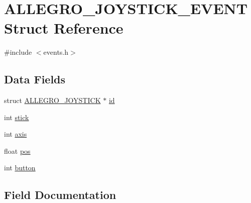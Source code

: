 \hypertarget{struct_a_l_l_e_g_r_o___j_o_y_s_t_i_c_k___e_v_e_n_t}{}\section{A\+L\+L\+E\+G\+R\+O\+\_\+\+J\+O\+Y\+S\+T\+I\+C\+K\+\_\+\+E\+V\+E\+NT Struct Reference}
\label{struct_a_l_l_e_g_r_o___j_o_y_s_t_i_c_k___e_v_e_n_t}


{\ttfamily \#include $<$events.\+h$>$}

\subsection*{Data Fields}
\begin{DoxyCompactItemize}
\item 
struct \hyperlink{joystick_8h_aae8de50d096b6e89e4796ceb2f78b925}{A\+L\+L\+E\+G\+R\+O\+\_\+\+J\+O\+Y\+S\+T\+I\+CK} $\ast$ \hyperlink{struct_a_l_l_e_g_r_o___j_o_y_s_t_i_c_k___e_v_e_n_t_a6d834b074d326f2ef56f8b7fb4c46da5}{id}
\item 
int \hyperlink{struct_a_l_l_e_g_r_o___j_o_y_s_t_i_c_k___e_v_e_n_t_a47182d42be549a78223d467d587a2e94}{stick}
\item 
int \hyperlink{struct_a_l_l_e_g_r_o___j_o_y_s_t_i_c_k___e_v_e_n_t_a0496f5b84f6d84344e2e59520c77bdb5}{axis}
\item 
float \hyperlink{struct_a_l_l_e_g_r_o___j_o_y_s_t_i_c_k___e_v_e_n_t_aa51cb89828f7479cc1d507a5d2ce64b5}{pos}
\item 
int \hyperlink{struct_a_l_l_e_g_r_o___j_o_y_s_t_i_c_k___e_v_e_n_t_abacb1616777ab7bcdf45af50277bfbac}{button}
\end{DoxyCompactItemize}


\subsection{Field Documentation}
\mbox{\label{struct_a_l_l_e_g_r_o___j_o_y_s_t_i_c_k___e_v_e_n_t_a0496f5b84f6d84344e2e59520c77bdb5}} 

